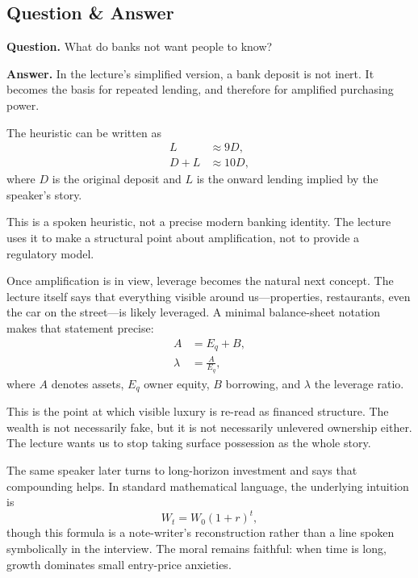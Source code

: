 \subsection{Question \& Answer}

\textbf{Question.} What do banks not want people to know?

\textbf{Answer.} In the lecture's simplified version, a bank deposit is not inert. It becomes the basis for repeated lending, and therefore for amplified purchasing power.

The heuristic can be written as
\begin{align}
L &\approx 9D,\\
D+L &\approx 10D,
\end{align}
where \(D\) is the original deposit and \(L\) is the onward lending implied by the speaker's story.

\begin{remark}
This is a spoken heuristic, not a precise modern banking identity. The lecture uses it to make a structural point about amplification, not to provide a regulatory model.
\end{remark}

Once amplification is in view, leverage becomes the natural next concept. The lecture itself says that everything visible around us---properties, restaurants, even the car on the street---is likely leveraged. A minimal balance-sheet notation makes that statement precise:
\begin{align}
A &= E_q + B,\\
\lambda &= \frac{A}{E_q},
\end{align}
where \(A\) denotes assets, \(E_q\) owner equity, \(B\) borrowing, and \(\lambda\) the leverage ratio.

This is the point at which visible luxury is re-read as financed structure. The wealth is not necessarily fake, but it is not necessarily unlevered ownership either. The lecture wants us to stop taking surface possession as the whole story.

The same speaker later turns to long-horizon investment and says that compounding helps. In standard mathematical language, the underlying intuition is
\begin{equation}
W_t = W_0(1+r)^t,
\end{equation}
though this formula is a note-writer's reconstruction rather than a line spoken symbolically in the interview. The moral remains faithful: when time is long, growth dominates small entry-price anxieties.

